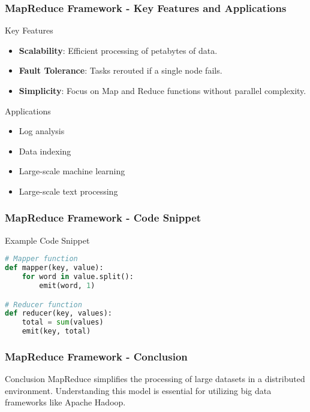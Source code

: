 \documentclass[aspectratio=169]{beamer}
\begin{document}
\begin{frame}[fragile]
    \frametitle{MapReduce Framework - Key Features and Applications}
    \begin{block}{Key Features}
        \begin{itemize}
            \item \textbf{Scalability}: Efficient processing of petabytes of data.
            \item \textbf{Fault Tolerance}: Tasks rerouted if a single node fails.
            \item \textbf{Simplicity}: Focus on Map and Reduce functions without parallel complexity.
        \end{itemize}
    \end{block}
    
    \begin{block}{Applications}
        \begin{itemize}
            \item Log analysis
            \item Data indexing
            \item Large-scale machine learning
            \item Large-scale text processing
        \end{itemize}
    \end{block}
\end{frame}

\begin{frame}[fragile]
    \frametitle{MapReduce Framework - Code Snippet}
    \begin{block}{Example Code Snippet}
        \begin{lstlisting}[language=Python]
# Mapper function
def mapper(key, value):
    for word in value.split():
        emit(word, 1)

# Reducer function
def reducer(key, values):
    total = sum(values)
    emit(key, total)
        \end{lstlisting}
    \end{block}
\end{frame}

\begin{frame}
    \frametitle{MapReduce Framework - Conclusion}
    \begin{block}{Conclusion}
        MapReduce simplifies the processing of large datasets in a distributed environment. 
        Understanding this model is essential for utilizing big data frameworks like Apache Hadoop.
    \end{block}
\end{frame}
\end{document}
